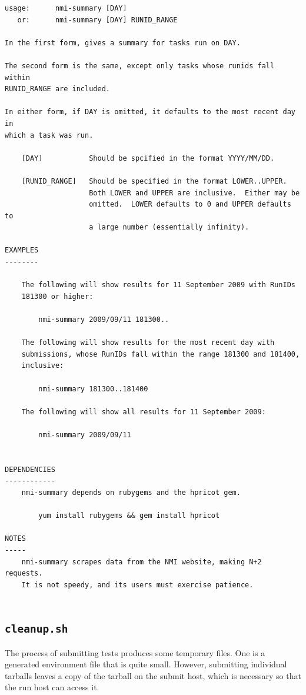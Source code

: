 \begin{verbatim}
usage:      nmi-summary [DAY]
   or:      nmi-summary [DAY] RUNID_RANGE

In the first form, gives a summary for tasks run on DAY.

The second form is the same, except only tasks whose runids fall within
RUNID_RANGE are included.

In either form, if DAY is omitted, it defaults to the most recent day in
which a task was run.

    [DAY]           Should be spcified in the format YYYY/MM/DD.

    [RUNID_RANGE]   Should be specified in the format LOWER..UPPER.
                    Both LOWER and UPPER are inclusive.  Either may be
                    omitted.  LOWER defaults to 0 and UPPER defaults to
                    a large number (essentially infinity).

EXAMPLES
--------

    The following will show results for 11 September 2009 with RunIDs
    181300 or higher:

        nmi-summary 2009/09/11 181300..

    The following will show results for the most recent day with
    submissions, whose RunIDs fall within the range 181300 and 181400,
    inclusive:

        nmi-summary 181300..181400

    The following will show all results for 11 September 2009:

        nmi-summary 2009/09/11


DEPENDENCIES
------------
    nmi-summary depends on rubygems and the hpricot gem.

        yum install rubygems && gem install hpricot

NOTES
-----
    nmi-summary scrapes data from the NMI website, making N+2 requests.
    It is not speedy, and its users must exercise patience.
    
\end{verbatim}


\subsection{{\tt cleanup.sh}}
The process of submitting tests produces some temporary files.  One is a
generated environment file that is quite small.  However, submitting individual
tarballs leaves a copy of the tarball on the submit host, which is necessary so
that the run host can access it.

